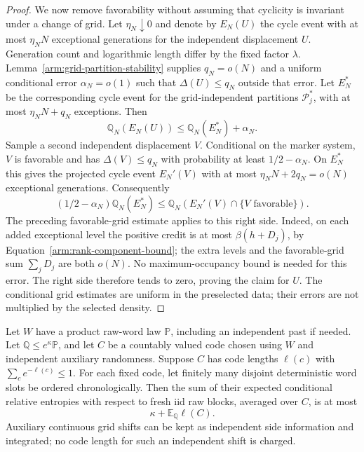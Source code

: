 \begin{proof}
We now remove favorability without assuming that cyclicity is
invariant under a change of grid.  Let $\eta_N\downarrow0$ and denote
by $E_N(U)$ the cycle event with at most $\eta_NN$ exceptional
generations for the independent displacement $U$.  Generation count
and logarithmic length differ by the fixed factor $\lambda$.
Lemma~\ref{arm:grid-partition-stability} supplies $q_N=o(N)$ and a
uniform conditional error $\alpha_N=o(1)$ such that
$\Delta(U)\le q_N$ outside that error.  Let $E_N^*$ be the corresponding
cycle event for the grid-independent partitions $\mathcal P_j^*$,
with at most $\eta_NN+q_N$ exceptions.  Then
\[
 \mathbb Q_N(E_N(U))\le\mathbb Q_N(E_N^*)+\alpha_N.
\]
Sample a second independent displacement $V$.  Conditional on the
marker system, $V$ is favorable and has $\Delta(V)\le q_N$ with
probability at least $1/2-\alpha_N$.  On $E_N^*$ this gives the
projected cycle event $E_N'(V)$ with at most $\eta_NN+2q_N=o(N)$
exceptional generations.  Consequently
\[
 (1/2-\alpha_N)\mathbb Q_N(E_N^*)
 \le \mathbb Q_N(E_N'(V)\cap\{V\text{ favorable}\}).
\]
The preceding favorable-grid estimate applies to this right side.
Indeed, on each added exceptional level the positive credit is at
most $\beta(h+D_j)$, by Equation~\eqref{arm:rank-component-bound};
the extra levels and the favorable-grid sum $\sum_jD_j$ are both
$o(N)$.  No maximum-occupancy bound is needed for this error.  The
right side therefore tends to zero, proving the claim for $U$.
The conditional grid estimates are uniform in the preselected data;
their errors are not multiplied by the selected density.
\end{proof}

\begin{lemma}
\label{arm:entropy-allocation}
Let $W$ have a product raw-word law $\mathbb P$, including an
independent past if needed.  Let $\mathbb Q\le e^\kappa\mathbb P$,
and let $C$ be a countably valued code chosen using $W$ and independent
auxiliary randomness.  Suppose $C$ has code lengths $\ell(c)$ with
$\sum_c e^{-\ell(c)}\le1$.  For each fixed code, let finitely many
disjoint deterministic word slots be ordered chronologically.  Then
the sum of their expected conditional relative entropies with respect
to fresh iid raw blocks, averaged over $C$, is at most
\begin{equation}\label{arm:entropy-total}
 \kappa+\mathbb E_{\mathbb Q}\ell(C).
\end{equation}
Auxiliary continuous grid shifts can be kept as independent side
information and integrated; no code length for such an independent
shift is charged.
\end{lemma}

